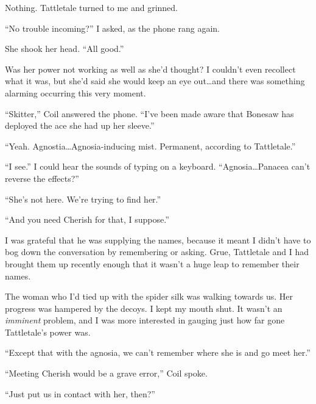 Nothing.  Tattletale turned to me and grinned.



``No trouble incoming?''  I asked, as the phone rang again.



She shook her head.  ``All good.''



Was her power not working as well as she'd thought?  I couldn't even recollect what it was, but she'd said she would keep an eye out\ldots and there was something alarming occurring this very moment.



``Skitter,'' Coil answered the phone.  ``I've been made aware that Bonesaw has deployed the ace she had up her sleeve.''



``Yeah.  Agnostia\ldots Agnosia-inducing mist.  Permanent, according to Tattletale.''



``I see.''  I could hear the sounds of typing on a keyboard.  ``Agnosia\ldots Panacea can't reverse the effects?''



``She's not here.  We're trying to find her.''



``And you need Cherish for that, I suppose.''



I was grateful that he was supplying the names, because it meant I didn't have to bog down the conversation by remembering or asking.  Grue, Tattletale and I had brought them up recently enough that it wasn't a huge leap to remember their names.



The woman who I'd tied up with the spider silk was walking towards us.  Her progress was hampered by the decoys.  I kept my mouth shut.  It wasn't an \emph{imminent} problem, and I was more interested in gauging just how far gone Tattletale's power was.



``Except that with the agnosia, we can't remember where she is and go meet her.''



``Meeting Cherish would be a grave error,'' Coil spoke.



``Just put us in contact with her, then?''



